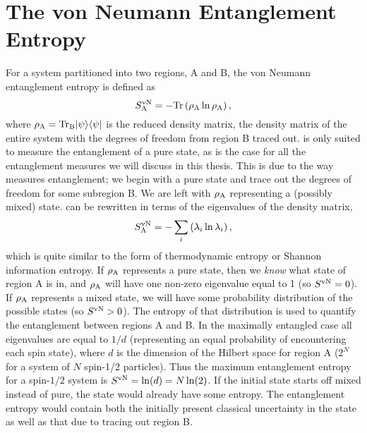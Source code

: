 \section{The von Neumann Entanglement Entropy}
For a system partitioned into two regions, A and B, the von Neumann entanglement entropy \vn is defined as
\begin{equation}
	S^{\text{vN}}_\text{A} = -\rm{Tr}\left({\rho_A \ln \rho_A}\right),
\end{equation}
where $\rho_{\rm{A}}=\rm{Tr}_B\lvert {\psi} \rangle\langle {\psi} \rvert$ is the reduced density matrix, the density matrix of the entire system with the degrees of freedom from region B traced out.
\vn is only suited to measure the entanglement of a pure state, as is the case for all the entanglement measures we will discuss in this thesis.
This is due to the way \vn measures entanglement; we begin with a pure state and trace out the degrees of freedom for some subregion B.  
We are left with $\rho_{\rm A}$ representing a (possibly mixed) state.
\vn can be rewritten in terms of the eigenvalues of the density matrix,
\begin{equation}
S^{\text{vN}}_\text{A} = -\sum_i \left(\lambda_i \ln \lambda_i\right),
\end{equation}
which is quite similar to the form of thermodynamic entropy or Shannon information entropy. If $\rho_{\rm A}$ represents a pure state, then we {\it know} what state of region A is in, and $\rho_{\rm A}$ will have one non-zero eigenvalue equal to 1 (so $S^{\text{vN}} = 0$).
If $\rho_{\rm A}$ represents a mixed state, we will have some probability distribution of the possible states (so $S^{\text{vN}} > 0$). The entropy of that distribution is used to quantify the entanglement between regions A and B.
In the maximally entangled case all eigenvalues are equal to $1/d$ (representing an equal probability of encountering each spin state), where $d$ is the dimension of the Hilbert space for region A ($2^N$ for a system of $N$ spin-1/2 particles). Thus the maximum entanglement entropy for a spin-$1/2$ system is $S^{\text{vN}}= \ln (d) = N \ln(2)$. 
If the initial state starts off mixed instead of pure, the state would already have some entropy. The entanglement entropy would contain both the initially present classical uncertainty in the state as well as that due to tracing out region B.

